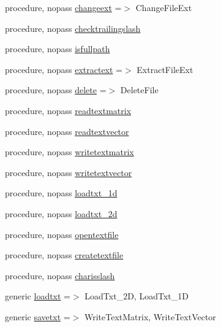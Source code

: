 \begin{DoxyCompactItemize}
procedure, nopass \mbox{\hyperlink{structfileutils_1_1tfile_a41b8a401f6adb6ca38d7e320b2926bc9}{changeext}} =$>$ Change\+File\+Ext
\item 
procedure, nopass \mbox{\hyperlink{structfileutils_1_1tfile_a3c097546599bb4452b484993c031a952}{checktrailingslash}}
\item 
procedure, nopass \mbox{\hyperlink{structfileutils_1_1tfile_a915fecc92139d885a612c683cfabb722}{isfullpath}}
\item 
procedure, nopass \mbox{\hyperlink{structfileutils_1_1tfile_a0f0490f23018f0ab794bdb5f3e61212b}{extractext}} =$>$ Extract\+File\+Ext
\item 
procedure, nopass \mbox{\hyperlink{structfileutils_1_1tfile_a43cba336fd245cad4dc576c4f371d544}{delete}} =$>$ Delete\+File
\item 
procedure, nopass \mbox{\hyperlink{structfileutils_1_1tfile_a90ddfc45e38b5df0c5afc36b94879c4b}{readtextmatrix}}
\item 
procedure, nopass \mbox{\hyperlink{structfileutils_1_1tfile_a77d349f6e25307d4c96ed4baf7416465}{readtextvector}}
\item 
procedure, nopass \mbox{\hyperlink{structfileutils_1_1tfile_addc8b3930c4ae32a925e508a26519797}{writetextmatrix}}
\item 
procedure, nopass \mbox{\hyperlink{structfileutils_1_1tfile_acc48d97e24439f19601ffcd14e133c2c}{writetextvector}}
\item 
procedure, nopass \mbox{\hyperlink{structfileutils_1_1tfile_a8f8225b40d3754ecf00a357196da7f65}{loadtxt\+\_\+1d}}
\item 
procedure, nopass \mbox{\hyperlink{structfileutils_1_1tfile_a045535823c4cdfc8c2fbfc0302d30058}{loadtxt\+\_\+2d}}
\item 
procedure, nopass \mbox{\hyperlink{structfileutils_1_1tfile_a4e99397c09f386101f39ca86bae2a275}{opentextfile}}
\item 
procedure, nopass \mbox{\hyperlink{structfileutils_1_1tfile_ab5d94a0151ce5d24d920511fd9ae9299}{createtextfile}}
\item 
procedure, nopass \mbox{\hyperlink{structfileutils_1_1tfile_ac1876907d9647ee065fbd14413e9e81b}{charisslash}}
\item 
generic \mbox{\hyperlink{structfileutils_1_1tfile_a955fbc6ed5aa8dc33c0c46012fe25458}{loadtxt}} =$>$ Load\+Txt\+\_\+2D, Load\+Txt\+\_\+1D
\item 
generic \mbox{\hyperlink{structfileutils_1_1tfile_a3157f41086d721e24f9bfd553742ecfa}{savetxt}} =$>$ Write\+Text\+Matrix, Write\+Text\+Vector
\end{DoxyCompactItemize}


